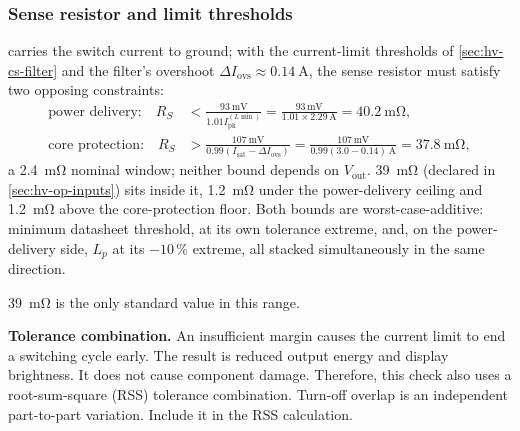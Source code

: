 \subsubsection{Sense resistor and limit thresholds}\label{sec:hv-cs-sense}

 carries the switch current to ground; with the current-limit
thresholds of \cref{sec:hv-cs-filter} and the filter's overshoot $\Delta I_{\mathrm{ovs}}
\approx \SI{0.14}{\ampere}$, the sense resistor must satisfy two opposing
constraints:
\begin{align*}
  \text{power delivery:}\quad
    R_{S} &< \frac{\SI{93}{\milli\volt}}{1.01 I_{\mathrm{pk}}^{(L\min)}}
          = \frac{93\,\si{\milli\volt}}{1.01\times2.29\,\si{\ampere}} = \SI{40.2}{\milli\ohm},\\
  \text{core protection:}\quad
    R_{S} &> \frac{\SI{107}{\milli\volt}}{0.99(I_{\mathrm{sat}} - \Delta I_{\mathrm{ovs}})}
          = \frac{107\,\si{\milli\volt}}{0.99(3.0 - 0.14)\,\si{\ampere}} = \SI{37.8}{\milli\ohm},
\end{align*}
a \SI{2.4}{\milli\ohm} nominal window; neither bound depends on
$V_{\mathrm{out}}$. \SI{39}{\milli\ohm} (declared in \cref{sec:hv-op-inputs})
sits inside it, \SI{1.2}{\milli\ohm} under the power-delivery ceiling and
\SI{1.2}{\milli\ohm} above the core-protection floor. Both bounds are
worst-case-additive: minimum datasheet threshold,  at its own
tolerance extreme, and, on the power-delivery side, $L_p$ at its $-10\,\%$
extreme, all stacked simultaneously in the same direction.

\SI{39}{\milli\ohm} is the only standard value in this range.

\textbf{Tolerance combination.} An insufficient margin causes the current
limit to end a switching cycle early. The result is reduced output energy and
display brightness. It does not cause component damage. Therefore, this check
also uses a root-sum-square (RSS) tolerance combination. Turn-off overlap is an
independent part-to-part variation. Include it in the RSS calculation.

